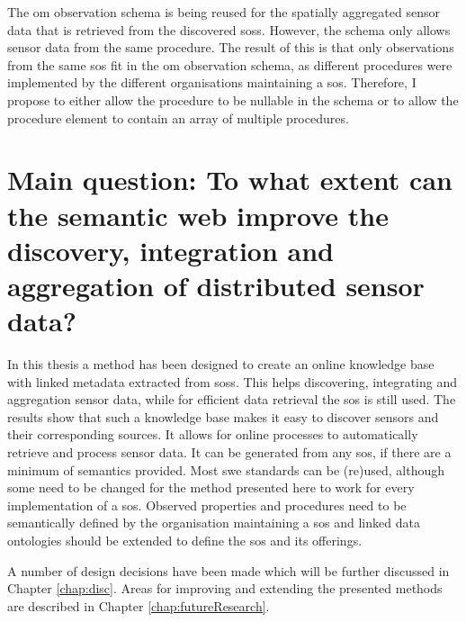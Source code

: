 The \ac{om} observation schema is being reused for the spatially aggregated sensor data that is retrieved from the discovered \aclp{sos}. However, the schema only allows sensor data from the same procedure. The result of this is that only observations from the same \ac{sos} fit in the \ac{om} observation schema, as different procedures were implemented by the different organisations maintaining a \ac{sos}. Therefore, I propose to either allow the procedure to be nullable in the schema or to allow the procedure element to contain an array of multiple procedures.  


\section*{\textbf{Main question:} To what extent can the semantic web improve the discovery, integration and aggregation of distributed sensor data?}%

In this thesis a method has been designed to create an online knowledge base with linked metadata extracted from \aclp{sos}. This helps discovering, integrating and aggregation sensor data, while for efficient data retrieval the \ac{sos} is still used. The results show that such a knowledge base makes it easy to discover sensors and their corresponding sources. It allows for online processes to automatically retrieve and process sensor data. It can be generated from any \ac{sos}, if there are a minimum of semantics provided. Most \ac{swe} standards can be (re)used, although some need to be changed for the method presented here to work for every implementation of a \ac{sos}. Observed properties and procedures need to be semantically defined by the organisation maintaining a \ac{sos} and linked data ontologies should be extended to define the \acl{sos} and its offerings. 

A number of design decisions have been made which will be further discussed in Chapter \ref{chap:disc}. Areas for improving and extending the presented methods are described in Chapter \ref{chap:futureResearch}.
